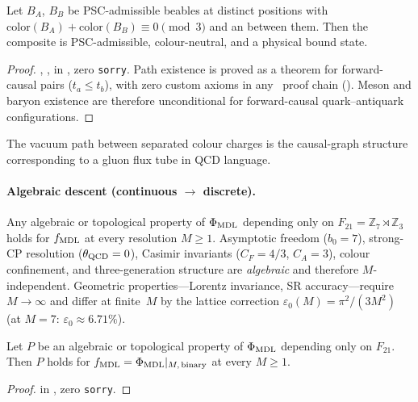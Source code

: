 \begin{theorem}
\label{thm:spatial_lifting}
Let $B_A$, $B_B$ be PSC-admissible beables at distinct positions with
$\mathrm{color}(B_A) + \mathrm{color}(B_B) \equiv 0 \pmod{3}$ and an  between them.
Then the composite is PSC-admissible, colour-neutral, and a physical bound state.
\begin{proof}
, ,
 in , zero \texttt{sorry}.
Path existence  is proved as a theorem for forward-causal pairs
($t_a \leq t_b$), with zero custom axioms in any \CatAL\ proof chain ().
Meson and baryon existence are therefore unconditional for forward-causal quark--antiquark
configurations.
\end{proof}
\end{theorem}

The vacuum path between separated colour charges is the causal-graph structure corresponding to a gluon flux tube in QCD language.

\paragraph{Algebraic descent (continuous $\to$ discrete).}
Any algebraic or topological property of $\Phi_{\rm MDL}$ depending only on $F_{21} = \mathbb{Z}_7 \rtimes \mathbb{Z}_3$ holds for $f_{\rm MDL}$ at every resolution $M \geq 1$.
Asymptotic freedom ($b_0 = 7$), strong-CP resolution ($\theta_{\rm QCD} = 0$), Casimir invariants ($C_F = 4/3$, $C_A = 3$), colour confinement, and three-generation structure are \emph{algebraic} and therefore $M$-independent.
Geometric properties---Lorentz invariance, SR accuracy---require $M \to \infty$ and differ at finite~$M$ by the lattice correction $\varepsilon_0(M) = \pi^2/(3M^2)$ (at $M = 7$: $\varepsilon_0 \approx 6.71\%$).

\begin{theorem}
\label{thm:algebraic_descent}
Let $P$ be an algebraic or topological property of $\Phi_{\rm MDL}$ depending only on $F_{21}$.
Then $P$ holds for $f_{\rm MDL} = \Phi_{\rm MDL}|_{M,\,\mathrm{binary}}$ at every $M \geq 1$.
\begin{proof}
 in , zero \texttt{sorry}.
\end{proof}
\end{theorem}


